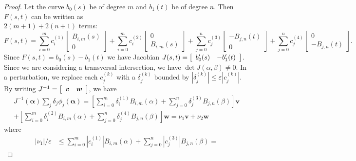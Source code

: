 \documentclass[3p, authoryear, square]{elsarticle}
\theoremstyle{definition}
\newcommand{\eps}{\varepsilon}
\begin{document}
\begin{proof}
Let the curve \(b_0(s)\) be of degree \(m\) and \(b_1(t)\) be of degree \(n\).
Then \(F(s, t)\) can be written as \\ \(2(m + 1) + 2(n + 1)\) terms:
\begin{equation}\label{eq:bezier-full-basis}
F(s, t) =
  \sum_{i = 0}^m c_i^{(1)} \left[ \begin{array}{c}
  B_{i, m}(s) \\ 0 \end{array}\right] +
  \sum_{i = 0}^m c_i^{(2)} \left[ \begin{array}{c}
  0 \\ B_{i, m}(s) \end{array}\right] +
  \sum_{j = 0}^n c_j^{(3)} \left[ \begin{array}{c}
  -B_{j, n}(t) \\ 0 \end{array}\right] +
  \sum_{j = 0}^n c_j^{(4)} \left[ \begin{array}{c}
  0 \\ -B_{j, n}(t) \end{array}\right].
\end{equation}
Since \(F(s, t) = b_0(s) - b_1(t)\) we have Jacobian \(J(s, t) =
\left[ \begin{array}{c c} b_0'(s) & -b_1'(t) \end{array}\right]\). Since we
are considering a transversal intersection, we have
\(\det J(\alpha, \beta) \neq 0\). In a perturbation, we replace each
\(c_j^{(k)}\) with a \(\delta_j^{(k)}\) bounded by
\(\left|\delta_j^{(k)}\right| \leq \eps \left|c_j^{(k)}\right|\).
By writing \(J^{-1} = \left[ \begin{array}{c c}
\bm{v} & \bm{w} \end{array}\right]\), we have
\begin{multline}
J^{-1}\left(\bm{\alpha}\right) \sum_j \delta_j
  \phi_j\left(\bm{\alpha}\right) =
  \left[\sum_{i = 0}^m \delta_i^{(1)} B_{i, m}(\alpha) +
  \sum_{j = 0}^n \delta_j^{(3)} B_{j, n}(\beta)\right] \bm{v} \\
  + \left[\sum_{i = 0}^m \delta_i^{(2)} B_{i, m}(\alpha) +
  \sum_{j = 0}^n \delta_j^{(4)} B_{j, n}(\beta)\right] \bm{w} =
  \nu_1 \bm{v} + \nu_2 \bm{w}
\end{multline}
where
\begin{align}
\left|\nu_1\right| / \eps &\leq \sum_{i = 0}^m
  \left|c_{i}^{(1)}\right| B_{i, m}\left(\alpha\right) + \sum_{j = 0}^n
  \left|c_{j}^{(3)}\right| B_{j, n}\left(\beta\right) =

\end{align}
\end{proof}
\end{document}
